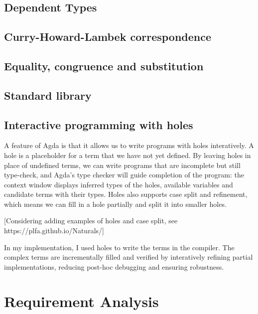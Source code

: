 \documentclass[12pt,twoside,a4paper]{report}
\theoremstyle{definition}
\begin{document}
        \subsection{Dependent Types}


        \subsection{Curry-Howard-Lambek correspondence}

        \subsection{Equality, congruence and substitution}


        \subsection{Standard library}
        
        \subsection{Interactive programming with holes}
        A feature of Agda is that it allows us to write programs with holes interatively. A hole is a placeholder for a term that we have not yet defined. By leaving holes in place of undefined terms, we can write programs that are incomplete but still type-check, and Agda's type checker will guide completion of the program: the context window displays inferred types of the holes, available variables and candidate terms with their types. Holes also supports case split and refinement, which means we can fill in a hole partially and split it into smaller holes. 

        [Considering adding examples of holes and case split, see https://plfa.github.io/Naturals/]

        In my implementation, I used holes to write the terms in the compiler. The complex terms are incrementally filled and verified by interatively refining partial implementations, reducing post-hoc debugging and ensuring robustness.


    \section{Requirement Analysis}
\end{document}
